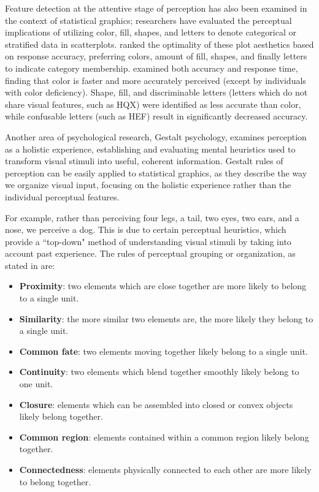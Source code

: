 \documentclass[11pt]{isuthesis}\usepackage[]{graphicx}\usepackage[]{color}
\begin{document}
Feature detection at the attentive stage of perception has also been examined in the context of statistical graphics; researchers have evaluated the perceptual implications of utilizing color, fill, shapes, and letters to denote categorical or stratified data in scatterplots. \citet{cleveland:1984} ranked the optimality of these plot aesthetics based on response accuracy, preferring colors, amount of fill, shapes, and finally letters to indicate category membership. \citet{lewandowsky1989discriminating} examined both accuracy and response time, finding that color is faster and more accurately perceived (except by individuals with color deficiency). Shape, fill, and discriminable letters (letters which do not share visual features, such as HQX) were identified as less accurate than color, while confusable letters (such as HEF) result in significantly decreased accuracy. 

Another area of psychological research, Gestalt psychology, examines perception as a holistic experience, establishing and evaluating mental heuristics used to transform visual stimuli into useful, coherent information. 
Gestalt rules of perception can be easily applied to statistical graphics, as they describe the way we organize visual input, focusing on the holistic experience rather than the individual perceptual features. 

For example, rather than perceiving four legs, a tail, two eyes, two ears, and a nose, we perceive a dog. This is due to certain perceptual heuristics, which provide a ``top-down" method of understanding visual stimuli by taking into account past experience. The rules of perceptual grouping or organization, as stated in \citet{goldstein2009encyclopedia} are:
\begin{itemize}
\item \textbf{Proximity}: two elements which are close together are more likely to belong to a single unit.
\item \textbf{Similarity}: the more similar two elements are, the more likely they belong to a single unit.
\item \textbf{Common fate}: two elements moving together likely belong to a single unit.
\item \textbf{Continuity}: two elements which blend together smoothly likely belong to one unit.
\item \textbf{Closure}: elements which can be assembled into closed or convex objects likely belong together. 
\item \textbf{Common region}: elements contained within a common region likely belong together. 
\item \textbf{Connectedness}: elements physically connected to each other are more likely to belong together.
\end{itemize}
\end{document}
